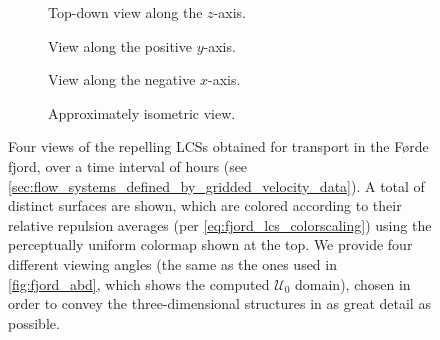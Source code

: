 \begin{figure}[htpb]
    \centering
    \vspace{5.0pt}

    \hspace*{\fill}
    \begin{subfigure}[b]{0.425\textwidth}
        \centering
        \caption[]{{\small Top-down view along the $z$-axis.}}
        \label{fig:fjord_lcss_z}
    \end{subfigure}\hfill%
    \begin{subfigure}[b]{0.425\textwidth}
        \centering
        \caption[]{{\small View along the positive $y$-axis.}}
        \label{fig:fjord_lcss_y}
    \end{subfigure}
    \hspace*{\fill}

    \hspace*{\fill}
    \begin{subfigure}[b]{0.425\textwidth}
        \centering
        \caption[]{{\small View along the negative $x$-axis.}}
        \label{fig:fjord_lcss_x}
    \end{subfigure}\hfill%
    \begin{subfigure}[b]{0.425\textwidth}
        \centering
        \caption[]{{\small Approximately isometric view.}}
        \label{fig:fjord_lcss_isometric}
    \end{subfigure}%
    \hspace*{\fill}
    \caption[Four views of the repelling LCSs obtained for transport in the
    Førde fjord]
    {
        Four views of the repelling LCSs obtained for transport in the Førde
        fjord, over a time interval of  hours (see
        \cref{sec:flow_systems_defined_by_gridded_velocity_data}). A total
        of  distinct surfaces are shown, which are colored
        according to their relative repulsion averages (per
        \cref{eq:fjord_lcs_colorscaling}) using the perceptually uniform
        colormap shown at the top. We provide four different viewing angles
        (the same as the ones used in \cref{fig:fjord_abd}, which shows
        the computed $\mathcal{U}_{0}$ domain), chosen in order to convey
        the three-dimensional structures in as great detail as possible.
}
    \label{fig:fjord_lcss}
\end{figure}

